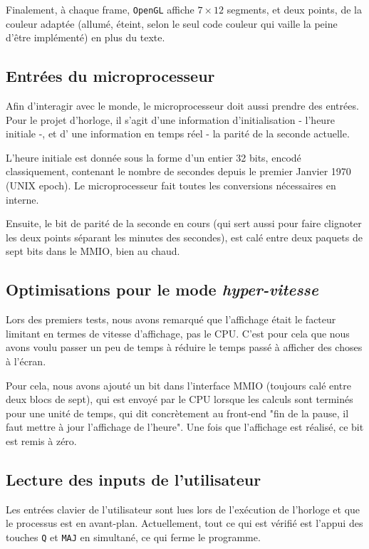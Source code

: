 \documentclass[10pt,a4paper,notitlepage ]{article}
\begin{document}
	Finalement, à chaque frame, \texttt{OpenGL} affiche $7\times 12$ segments, et deux points, de la couleur adaptée (allumé, éteint, selon le seul code couleur qui vaille la peine d'être implémenté) en plus du texte.
	
	\subsection{Entrées du microprocesseur}
	
	Afin d'interagir avec le monde, le microprocesseur doit aussi prendre des entrées. Pour le projet d'horloge, il s'agit d'une information d'initialisation - l'heure initiale -, et d' une information en temps réel - la parité de la seconde actuelle.
	
	L'heure initiale est donnée sous la forme d'un entier 32 bits, encodé classiquement, contenant le nombre de secondes depuis le premier Janvier 1970 (UNIX epoch). Le microprocesseur fait toutes les conversions nécessaires en interne.
	
	Ensuite, le bit de parité de la seconde en cours (qui sert aussi pour faire clignoter les deux points séparant les minutes des secondes), est calé entre deux paquets de sept bits dans le MMIO, bien au chaud.
	
	\subsection{Optimisations pour le mode \textit{hyper-vitesse}}
	
	Lors des premiers tests, nous avons remarqué que l'affichage était le facteur limitant en termes de vitesse d'affichage, pas le CPU. C'est pour cela que nous avons voulu passer un peu de temps à réduire le temps passé à afficher des choses à l'écran.
	
	Pour cela, nous avons ajouté un bit dans l'interface MMIO (toujours calé entre deux blocs de sept), qui est envoyé par le CPU lorsque les calculs sont terminés pour une unité de temps, qui dit concrètement au front-end "fin de la pause, il faut mettre à jour l'affichage de l'heure". Une fois que l'affichage est réalisé, ce bit est remis à zéro.
	
	\subsection{Lecture des inputs de l'utilisateur}
	
	Les entrées clavier de l'utilisateur sont lues lors de l'exécution de l'horloge et que le processus est en avant-plan. Actuellement, tout ce qui est vérifié est l'appui des touches \texttt{Q} et \texttt{MAJ} en simultané, ce qui ferme le programme.
	
\end{document}
